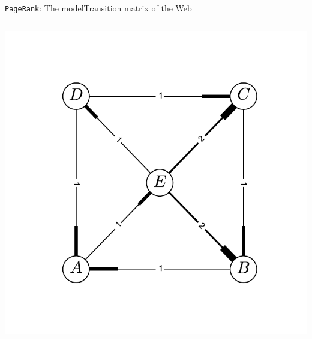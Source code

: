 \documentclass[xcolor=table,final]{beamer} %
\newcommand{\PageRank}{\texttt{PageRank}\xspace}
\begin{document}
\begin{frame}{\PageRank : The model}{Transition matrix of the Web}

  \begin{columns}
    \includegraphics[width=1.\textwidth]{figs/tex/graph}


\end{columns}
\end{frame}
\end{document}
